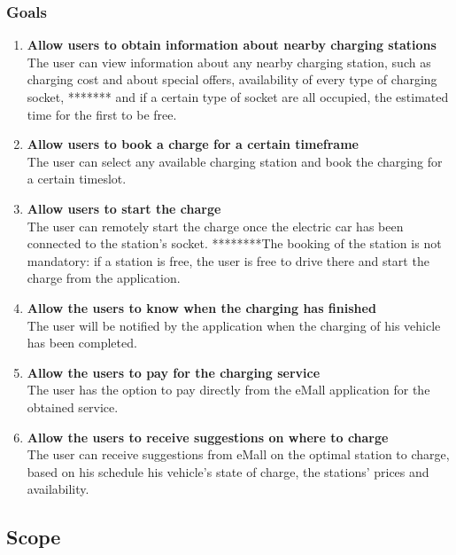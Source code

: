 \subsubsection{Goals}
\begin{enumerate}[label=$\bullet$ \textbf{G\arabic*:}]
        \item \textbf{Allow users to obtain information about nearby charging stations}
        \\
        The user can view information about any nearby charging station, 
        such as charging cost and about special offers, availability of every type of charging socket, 
         ******* and if a certain type of socket are all occupied,
         the estimated time for the first to be free.
        \item \textbf{Allow users to book a charge for a certain timeframe}
        \\
        The user can select any available charging station and book the charging for a certain timeslot. 
        \item \textbf{Allow users to start the charge}
        \\
        The user can remotely start the charge once the electric car has been connected to the station's socket. ********The booking of the station is not mandatory: if a station is free, the user is free to drive there and start the charge from the application.
        \item \textbf{Allow the users to know when the charging has finished}
        \\
        The user will be notified by the application when the charging of his vehicle has been completed.
        \item \textbf{Allow the users to pay for the charging service}
        \\
        The user has the option to pay directly from the eMall application for the obtained service.
        \item \textbf{Allow the users to receive suggestions on where to charge}
        \\
        The user can receive suggestions from eMall on the optimal station to charge, based on his schedule his vehicle's state of charge, the stations' prices and availability.
\end{enumerate}

\subsection{Scope}
